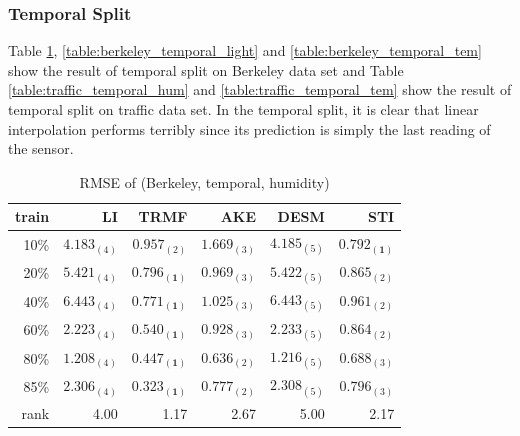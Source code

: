 \subsubsection{Temporal Split}
Table \ref{table:berkeley_temporal_hum}, \ref{table:berkeley_temporal_light} and \ref{table:berkeley_temporal_tem} show the result of temporal split on Berkeley data set and Table \ref{table:traffic_temporal_hum} and \ref{table:traffic_temporal_tem} show the result of temporal split on traffic data set.
In the temporal split, it is clear that linear interpolation performs terribly since its prediction is simply the last reading of the sensor.

\begin{table}[htbp]
\centering
\caption{RMSE of (Berkeley, temporal, humidity)}
\label{table:berkeley_temporal_hum}
\begin{tabular}{ r | r r r r r}
	train	&LI	&TRMF	&AKE	&DESM	&STI\\ \hline
	10\% & $ 4.183_{(4)} $ & $ 0.957_{(2)} $ & $ 1.669_{(3)} $ & $ 4.185_{(5)} $ & $ \mathbf{ 0.792_{(1)} } $ \\
	20\% & $ 5.421_{(4)} $ & $ \mathbf{ 0.796_{(1)} } $ & $ 0.969_{(3)} $ & $ 5.422_{(5)} $ & $ 0.865_{(2)} $ \\
	40\% & $ 6.443_{(4)} $ & $ \mathbf{ 0.771_{(1)} } $ & $ 1.025_{(3)} $ & $ 6.443_{(5)} $ & $ 0.961_{(2)} $ \\
	60\% & $ 2.223_{(4)} $ & $ \mathbf{ 0.540_{(1)} } $ & $ 0.928_{(3)} $ & $ 2.233_{(5)} $ & $ 0.864_{(2)} $ \\
	80\% & $ 1.208_{(4)} $ & $ \mathbf{ 0.447_{(1)} } $ & $ 0.636_{(2)} $ & $ 1.216_{(5)} $ & $ 0.688_{(3)} $ \\
	85\% & $ 2.306_{(4)} $ & $ \mathbf{ 0.323_{(1)} } $ & $ 0.777_{(2)} $ & $ 2.308_{(5)} $ & $ 0.796_{(3)} $ \\ \hline
	rank &4.00 &1.17 &2.67 &5.00 &2.17 \\
\end{tabular}
\end{table}

